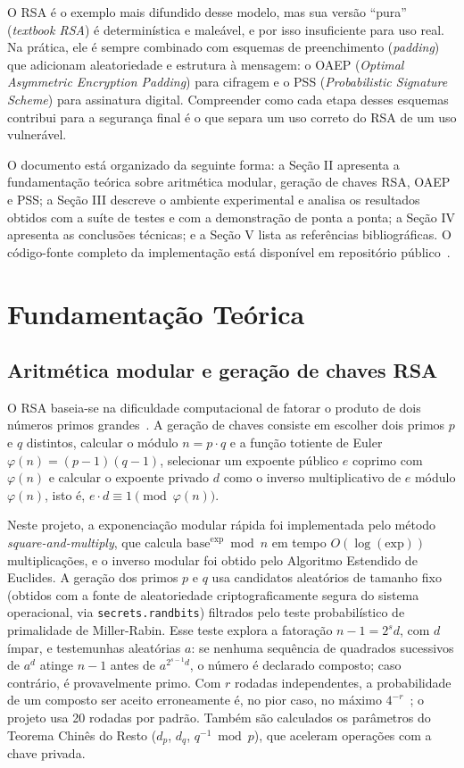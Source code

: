 \documentclass[conference]{IEEEtran}
\begin{document}
O RSA é o exemplo mais difundido desse modelo, mas sua versão ``pura'' (\textit{textbook RSA})
é determinística e maleável, e por isso insuficiente para uso real. Na prática, ele é sempre
combinado com esquemas de preenchimento (\textit{padding}) que adicionam aleatoriedade e
estrutura à mensagem: o OAEP (\textit{Optimal Asymmetric Encryption Padding}) para cifragem e
o PSS (\textit{Probabilistic Signature Scheme}) para assinatura digital. Compreender como
cada etapa desses esquemas contribui para a segurança final é o que separa um uso correto do
RSA de um uso vulnerável.

O documento está organizado da seguinte forma: a Seção II apresenta a fundamentação teórica
sobre aritmética modular, geração de chaves RSA, OAEP e PSS; a Seção III descreve o ambiente
experimental e analisa os resultados obtidos com a suíte de testes e com a demonstração de
ponta a ponta; a Seção IV apresenta as conclusões técnicas; e a Seção V lista as referências
bibliográficas. O código-fonte completo da implementação está disponível em repositório
público~\cite{repo}.

\section{Fundamentação Teórica}

\subsection{Aritmética modular e geração de chaves RSA}

O RSA baseia-se na dificuldade computacional de fatorar o produto de dois números primos
grandes~\cite{menezes1996handbook}. A geração de chaves consiste em escolher dois primos $p$
e $q$ distintos, calcular o módulo $n = p \cdot q$ e a função totiente de Euler
$\varphi(n) = (p-1)(q-1)$, selecionar um expoente público $e$ coprimo com $\varphi(n)$ e
calcular o expoente privado $d$ como o inverso multiplicativo de $e$ módulo $\varphi(n)$, isto
é, $e \cdot d \equiv 1 \pmod{\varphi(n)}$.

Neste projeto, a exponenciação modular rápida foi implementada pelo método
\textit{square-and-multiply}, que calcula $\text{base}^{\text{exp}} \bmod n$ em tempo
$O(\log(\text{exp}))$ multiplicações, e o inverso modular foi obtido pelo Algoritmo Estendido
de Euclides. A geração dos primos $p$ e $q$ usa candidatos aleatórios de tamanho fixo (obtidos
com a fonte de aleatoriedade criptograficamente segura do sistema operacional, via
\texttt{secrets.randbits}) filtrados pelo teste probabilístico de primalidade de Miller-Rabin.
Esse teste explora a fatoração $n - 1 = 2^{s}d$, com $d$ ímpar, e testemunhas aleatórias $a$: se
nenhuma sequência de quadrados sucessivos de $a^{d}$ atinge $n-1$ antes de $a^{2^{s-1}d}$, o
número é declarado composto; caso contrário, é provavelmente primo. Com $r$ rodadas
independentes, a probabilidade de um composto ser aceito erroneamente é, no pior caso, no
máximo $4^{-r}$~\cite{menezes1996handbook}; o projeto usa 20 rodadas por padrão. Também são
calculados os parâmetros do Teorema Chinês do Resto ($d_p$, $d_q$, $q^{-1} \bmod p$), que
aceleram operações com a chave privada.
\end{document}
